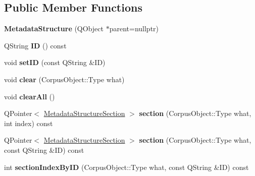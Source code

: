 \subsection*{Public Member Functions}
\begin{DoxyCompactItemize}
\item 
\mbox{\label{class_metadata_structure_a92d8d0c1bc391ace0397a16d71d79166}} 
{\bfseries Metadata\+Structure} (Q\+Object $\ast$parent=nullptr)
\item 
\mbox{\label{class_metadata_structure_ae56654254fb557da298d9a8a199aab86}} 
Q\+String {\bfseries ID} () const
\item 
\mbox{\label{class_metadata_structure_afbe19936056ef873f54eb5a3ab4770c1}} 
void {\bfseries set\+ID} (const Q\+String \&ID)
\item 
\mbox{\label{class_metadata_structure_a7a982984c027d972f690773ae641c766}} 
void {\bfseries clear} (Corpus\+Object\+::\+Type what)
\item 
\mbox{\label{class_metadata_structure_a794b206093add5e734e3a139fb6ed14b}} 
void {\bfseries clear\+All} ()
\item 
\mbox{\label{class_metadata_structure_a576c468c27bf586aaf40ccf6b1347076}} 
Q\+Pointer$<$ \hyperlink{class_metadata_structure_section}{Metadata\+Structure\+Section} $>$ {\bfseries section} (Corpus\+Object\+::\+Type what, int index) const
\item 
\mbox{\label{class_metadata_structure_a0145d67b561d80a23ae11287753d72fa}} 
Q\+Pointer$<$ \hyperlink{class_metadata_structure_section}{Metadata\+Structure\+Section} $>$ {\bfseries section} (Corpus\+Object\+::\+Type what, const Q\+String \&ID) const
\item 
\mbox{\label{class_metadata_structure_a0ae8de70a9b40df393b4049f195a75dd}} 
int {\bfseries section\+Index\+By\+ID} (Corpus\+Object\+::\+Type what, const Q\+String \&ID) const
\item 
\mbox{\label{class_metadata_structure_ab3118125738fc71f303bfd0d215f9555}} 

\end{DoxyCompactItemize}
